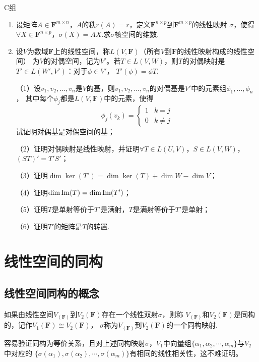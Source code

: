 \centerline{\heiti C组}
\begin{enumerate}
	\item 设矩阵$A \in \mathbf{F}^{m \times n}$，$A$的秩$r(A)=r$，定义$\mathbf{F}^{n \times p}$到$\mathbf{F}^{m \times p}$的线性映射
	$\sigma$，使得$\forall X \in \mathbf{F}^{n \times p}$，$\sigma(X)=AX$.求$\sigma$核空间的维数.
	\item 设$V$为数域$\mathbf{F}$上的线性空间，称$L(V,\mathbf{F})$（所有$V$到$\mathbf{F}$的线性映射构成的线性空间）
	为$V$的对偶空间，记为$V'$。若$T \in L(V,W)$，则$T$的对偶映射是$T' \in L(W',V')$：对于$\phi \in V'$，
	$T'(\phi)=\phi T$.

	\textup{（1）}设$v_1,v_2,\dots,v_n$是$V$的基，则$v_1,v_2,\dots,v_n$的对偶基是$V'$中的元素组$\phi_1,\dots,\phi_n$，
	其中每个$\phi_j$都是$L(V,\mathbf{F})$中的元素，使得
	$$\phi_j(v_k)=\begin{cases}
		1 & k=j \\ 0 & k \neq j
	\end{cases}$$
	试证明对偶基是对偶空间的基；

	\textup{（2）}证明对偶映射是线性映射，并证明$\forall T \in L(U,V)$，$S \in L(V,W)$，$(ST)'=T'S'$；

	\textup{（3）}证明$\dim \ker(T')=\dim \ker(T)+\dim W-\dim V$；

	\textup{（4）}证明$\dim \textup{Im}(T)=\dim \textup{Im}(T')$；

	\textup{（5）}证明$T$是单射等价于$T'$是满射，$T$是满射等价于$T'$是单射；

	\textup{（6）}证明$T'$的矩阵是$T$的转置.
\end{enumerate}
\section{线性空间的同构}
\subsection{线性空间同构的概念}
\begin{definition}
	如果由线性空间$V_(\mathbf{F})$到$V_2(\mathbf{F})$存在一个线性双射$\sigma$，则称
	$V_(\mathbf{F})$和$V_2(\mathbf{F})$是同构的，记作$V_1(\mathbf{F}) \cong V_2(\mathbf{F})$，
	$\sigma$称为$V_(\mathbf{F})$到$V_2(\mathbf{F})$的一个同构映射.
\end{definition}
容易验证同构为等价关系，且对上述同构映射$\sigma$，$V_1$中向量组$\{\alpha_1,\alpha_2,\cdots,\alpha_m\}$与$V_2$中对应的
$\{\sigma(\alpha_1),\sigma(\alpha_2),\cdots,\sigma(\alpha_m)\}$有相同的线性相关性，这不难证明。

